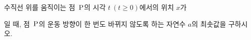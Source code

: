 수직선 위를 움직이는 점~$\mathrm{P}$의 시각 $t\ (t\ge 0)$에서의 위치 $x$가 \par\smallskip{}\par\smallskip\noindent 일 때, 점~$\mathrm{P}$의 운동 방향이 한 번도 바뀌지 않도록 하는 자연수 $a$의 최솟값을 구하시오.
